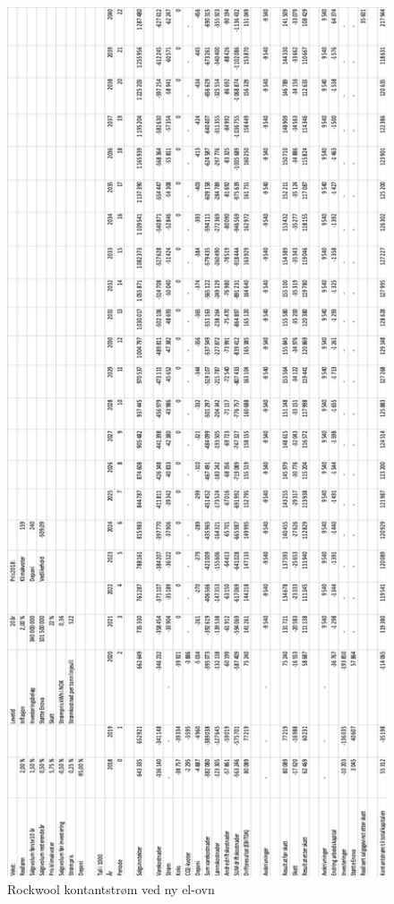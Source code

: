 \begin{figure}[H]
\centering
\includegraphics [scale=0.6]{appendiks/bilder/NNVelOvn.png}
\caption{Rockwool kontantstrøm ved ny el-ovn}
\label{fig:nnvelovn}
\end{figure}

